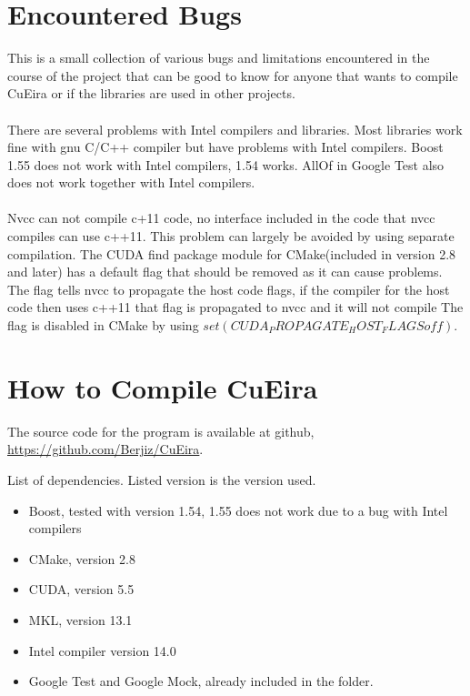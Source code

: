 \documentclass[10pt,a4paper]{report}
\begin{document}


\section{Encountered Bugs}
\label{found_bugs}
This is a small collection of various bugs and limitations encountered in the course of the project that can be good to know for anyone that wants to compile CuEira or if the libraries are used in other projects.\\
\\
There are several problems with Intel compilers and libraries. Most libraries work fine with gnu C/C++ compiler but have problems with Intel compilers. Boost 1.55 does not work with Intel compilers, 1.54 works. AllOf in Google Test also does not work together with Intel compilers.\\
\\
Nvcc can not compile c+11 code, no interface included in the code that nvcc compiles can use c++11. This problem can largely be avoided by using separate compilation. The CUDA find package module for CMake(included in version 2.8 and later) has a default flag that should be removed as it can cause problems. The flag tells nvcc to propagate the host code flags, if the compiler for the host code then uses c++11 that flag is propagated to nvcc and it will not compile The flag is disabled in CMake by using $set(CUDA_PROPAGATE_HOST_FLAGS off)$.

\section{How to Compile CuEira}
\label{compile_cueira}
The source code for the program is available at github, \url{https://github.com/Berjiz/CuEira}.

\begin{description}
    \item[List of dependencies. Listed version is the version used.]
\end{description}
\begin{itemize}
 \item Boost, tested with version 1.54, 1.55 does not work due to a bug with Intel compilers
 \item CMake, version 2.8
 \item CUDA, version 5.5
 \item MKL, version 13.1
 \item Intel compiler version 14.0
 \item Google Test and Google Mock, already included in the folder.
\end{itemize}


\newpage


\end{document}
